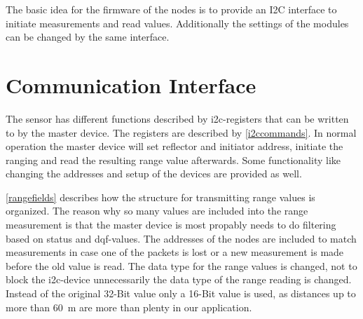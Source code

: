 
The basic idea for the firmware of the nodes is to provide an I2C interface to initiate measurements and read values.
Additionally the settings of the modules can be changed by the same interface.


\section{Communication Interface}



The sensor has different functions described by i2c-registers that can be written to by the master device.
The registers are described by \autoref{i2ccommands}.
In normal operation the master device will set reflector and initiator address, initiate the ranging and read the resulting range value afterwards.
Some functionality like changing the addresses and setup of the devices are provided as well.

\autoref{rangefields} describes how the structure for transmitting range values is organized.
The reason why so many values are included into the range measurement is that the master device is most propably needs to do filtering based on status and dqf-values. The addresses of the nodes are included to match measurements in case one of the packets is lost or a new measurement is made before the old value is read.
The data type for the range values is changed, not to block the i2c-device unnecessarily the data type of the range reading is changed.
Instead of the original 32-Bit value only a 16-Bit value is used, as distances up to more than \SI{60}{\metre} are more than plenty in our application.

